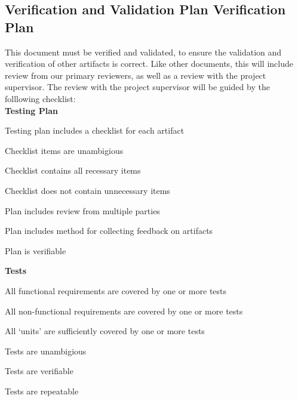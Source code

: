 \documentclass[12pt, titlepage]{article}
\begin{document}


\subsection{Verification and Validation Plan Verification Plan}
This document must be verified and validated, to ensure the validation and verification of other artifacts is correct. Like other documents, this will include review
from our primary reviewers, as well as a review with the project supervisor. The review with the project supervisor will be guided by the folllowing checklist:\\

\textbf{Testing Plan}\\
\begin{todolist}
  \item Testing plan includes a checklist for each artifact
  \item Checklist items are unambigious
  \item Checklist contains all recessary items
  \item Checklist does not contain unnecessary items
  \item Plan includes review from multiple parties
  \item Plan includes method for collecting feedback on artifacts
  \item Plan is verifiable
  \end{todolist}
\textbf{Tests}\\
\begin{todolist}
  \item All functional requirements are covered by one or more tests\\
  \item All non-functional requirements are covered by one or more tests\\
  \item All `units' are sufficiently covered by one or more tests\\
  \item Tests are unambigious
  \item Tests are verifiable
  \item Tests are repeatable
  \end{todolist}

\end{document}
